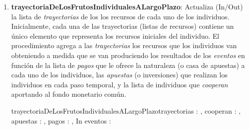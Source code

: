 \documentclass[10pt,a4paper]{article}
\begin{document}
\begin{enumerate}
\item \textbf{trayectoriaDeLosFrutosIndividualesALargoPlazo}: Actualiza (In/Out) la lista de \textit{trayectorias} de los los recursos de cada uno de los individuos. Inicialmente, cada una de las trayectorias (listas de recursos) contiene un único elemento que representa los recursos iniciales del individuo. El procedimiento agrega a las \textit{trayectorias} los recursos que los individuos van obteniendo a medida que se van produciendo los resultados de los \textit{eventos} en función de la lista de \textit{pagos} que le ofrece la naturaleza (o casa de apuestas) a cada uno de los individuos, las \textit{apuestas} (o inversiones) que realizan los individuos en cada paso temporal, y la lista de individuos que \textit{cooperan} aportando al fondo monetario común.

\vspace{16pt}

\begin{proc}{trayectoriaDeLosFrutosIndividualesALargoPlazo}{\Inout trayectorias : \TLista{\TLista{\float}}, \In cooperan : \TLista{\bool}, \In apuestas : \TLista{\TLista{\float}}, \In pagos : \TLista{\TLista{\float}}, In eventos : \TLista{\TLista{\nat}} }{}{}

    \vspace{\baselineskip}
    

\end{proc}
\end{enumerate}
\end{document}
